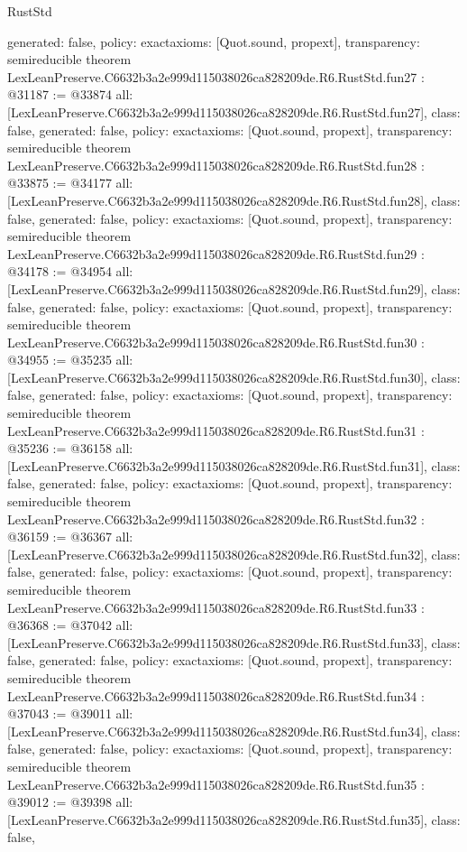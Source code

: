 \begin{lexlean}{RustStd}
\begin{coremodule}
{  generated: false,
  policy: exact{axioms: [Quot.sound, propext]},
  transparency: semireducible
}
theorem LexLeanPreserve.C6632b3a2e999d115038026ca828209de.R6.RustStd.fun27 : @31187 := @33874 {
  all: [LexLeanPreserve.C6632b3a2e999d115038026ca828209de.R6.RustStd.fun27],
  class: false,
  generated: false,
  policy: exact{axioms: [Quot.sound, propext]},
  transparency: semireducible
}
theorem LexLeanPreserve.C6632b3a2e999d115038026ca828209de.R6.RustStd.fun28 : @33875 := @34177 {
  all: [LexLeanPreserve.C6632b3a2e999d115038026ca828209de.R6.RustStd.fun28],
  class: false,
  generated: false,
  policy: exact{axioms: [Quot.sound, propext]},
  transparency: semireducible
}
theorem LexLeanPreserve.C6632b3a2e999d115038026ca828209de.R6.RustStd.fun29 : @34178 := @34954 {
  all: [LexLeanPreserve.C6632b3a2e999d115038026ca828209de.R6.RustStd.fun29],
  class: false,
  generated: false,
  policy: exact{axioms: [Quot.sound, propext]},
  transparency: semireducible
}
theorem LexLeanPreserve.C6632b3a2e999d115038026ca828209de.R6.RustStd.fun30 : @34955 := @35235 {
  all: [LexLeanPreserve.C6632b3a2e999d115038026ca828209de.R6.RustStd.fun30],
  class: false,
  generated: false,
  policy: exact{axioms: [Quot.sound, propext]},
  transparency: semireducible
}
theorem LexLeanPreserve.C6632b3a2e999d115038026ca828209de.R6.RustStd.fun31 : @35236 := @36158 {
  all: [LexLeanPreserve.C6632b3a2e999d115038026ca828209de.R6.RustStd.fun31],
  class: false,
  generated: false,
  policy: exact{axioms: [Quot.sound, propext]},
  transparency: semireducible
}
theorem LexLeanPreserve.C6632b3a2e999d115038026ca828209de.R6.RustStd.fun32 : @36159 := @36367 {
  all: [LexLeanPreserve.C6632b3a2e999d115038026ca828209de.R6.RustStd.fun32],
  class: false,
  generated: false,
  policy: exact{axioms: [Quot.sound, propext]},
  transparency: semireducible
}
theorem LexLeanPreserve.C6632b3a2e999d115038026ca828209de.R6.RustStd.fun33 : @36368 := @37042 {
  all: [LexLeanPreserve.C6632b3a2e999d115038026ca828209de.R6.RustStd.fun33],
  class: false,
  generated: false,
  policy: exact{axioms: [Quot.sound, propext]},
  transparency: semireducible
}
theorem LexLeanPreserve.C6632b3a2e999d115038026ca828209de.R6.RustStd.fun34 : @37043 := @39011 {
  all: [LexLeanPreserve.C6632b3a2e999d115038026ca828209de.R6.RustStd.fun34],
  class: false,
  generated: false,
  policy: exact{axioms: [Quot.sound, propext]},
  transparency: semireducible
}
theorem LexLeanPreserve.C6632b3a2e999d115038026ca828209de.R6.RustStd.fun35 : @39012 := @39398 {
  all: [LexLeanPreserve.C6632b3a2e999d115038026ca828209de.R6.RustStd.fun35],
  class: false,
}
\end{coremodule}
\end{lexlean}
